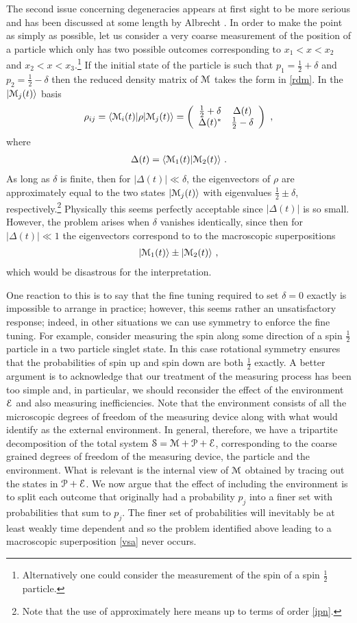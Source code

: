 \documentclass[12pt]{article}
\def\BP{{\EuScript P}}
\def\BM{{\EuScript M}}
\def\BS{{\EuScript S}}
\def\BE{{\EuScript E}}
\def\bra#1{\langle #1|}
\def\ket#1{| #1\rangle}
\def\braket#1#2{\VEV{#1 | #2}}
\def\VEV#1{\langle #1\rangle}
\newcommand{\EQ}[1]{\begin{equation}\begin{split} #1
\end{split}\end{equation}}
\begin{document}
The second issue concerning degeneracies appears at first sight to be more serious and has been discussed at some length by Albrecht \cite{Albrecht:1992uc}.
In order to make the point as simply as possible, let us consider a very coarse measurement of the position of a particle which only has two possible outcomes corresponding to $x_1<x<x_2$ and $x_2<x<x_3$.\footnote{Alternatively one could consider the measurement of the spin of a spin $\frac12$ particle.} If the initial state of the particle is such that 
$p_1=\frac12+\delta$ and $p_2=\frac12-\delta$ then the reduced density matrix of $\BM$ 
takes the form in \eqref{rdm}. In the $\ket{\BM_j(t)}$ basis
\EQ{
\rho_{ij}=\bra{\BM_i(t)}\rho\ket{\BM_j(t)}=\left(\begin{array}{cc}\frac12+\delta & \Delta(t)\\ \Delta(t)^*&\frac12-\delta\end{array}\right)\ ,
\label{tvv}
}
where 
\EQ{
\Delta(t)=\braket{\BM_1(t)}{\BM_2(t)}\ .
}
As long as $\delta$ is finite, then for $|\Delta(t)|\ll\delta$, the eigenvectors of $\rho$ are approximately equal to the two states $\ket{\BM_j(t)}$ with eigenvalues $\frac12\pm\delta$, respectively.\footnote{Note that the use of approximately here means up to terms of order \eqref{ipn}.}
Physically this seems perfectly acceptable since $|\Delta(t)|$ is so small.
However, the problem arises when $\delta$ vanishes identically, since then for $|\Delta(t)|\ll1$ the eigenvectors correspond to to the macroscopic superpositions
\EQ{
\ket{\BM_1(t)}\pm\ket{\BM_2(t)}\ ,
\label{vsa}
}
which would be disastrous for the interpretation.

One reaction to this is to say that the fine tuning required to set $\delta=0$ exactly is impossible to arrange in practice; however, this seems rather an unsatisfactory response; indeed, in other 
situations we can use symmetry to enforce the fine tuning. For example, consider measuring the spin along some direction of a spin $\frac12$ particle in a two particle singlet state. In this case rotational symmetry ensures that the probabilities of spin up and spin down are both $\frac12$ exactly.
A better argument is to acknowledge that our treatment of the measuring process has been too simple and, in particular, we should reconsider the effect of the environment $\BE$ and also measuring inefficiencies. Note that the environment consists of all the microscopic degrees of freedom of the measuring device along with what would identify 
as the external environment. In general, therefore, we have a tripartite decomposition of the total system $\BS=\BM+\BP+\BE$, corresponding to the coarse grained degrees of freedom of the measuring device, the particle and the environment. What is relevant is the internal view of $\BM$ obtained by tracing out the states in $\BP+\BE$. We now argue that the effect of including the environment is to split each outcome that originally had a probability $p_j$ into a finer set with probabilities that sum to $p_j$. The finer set of probabilities will inevitably be at least weakly time dependent and so
the problem identified above leading to a macroscopic superposition \eqref{vsa} never occurs. 
 
\end{document}
